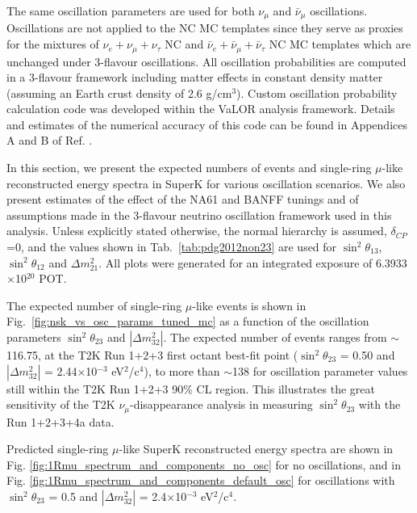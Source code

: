 The same oscillation parameters
are used for both $\nu_{\mu}$ and $\bar{\nu}_{\mu}$ oscillations.
Oscillations are not applied to the NC MC templates
since they serve as proxies for the mixtures of
$\nu_{e}+\nu_{\mu}+\nu_{\tau}$ NC and
$\bar{\nu}_{e}+\bar{\nu}_{\mu}+\bar{\nu}_{\tau}$ NC MC templates
which are unchanged under 3-flavour oscillations.
All oscillation probabilities are computed in a 3-flavour framework including matter effects in constant density matter
(assuming an Earth crust density of 2.6 g/cm$^{3}$).
Custom oscillation probability calculation code was developed within the VaLOR analysis framework.
Details and estimates of the numerical accuracy of this code can be found in 
Appendices A and B of Ref. \cite{OurRun123DisappAnalysis3Flavour}.


In this section, we present the expected numbers of events and single-ring $\mu$-like
reconstructed energy spectra in SuperK for various oscillation scenarios.
We also present estimates of the effect of the NA61 and BANFF tunings and of assumptions made in the 3-flavour
neutrino oscillation framework used in this analysis.
Unless explicitly stated otherwise, the normal hierarchy is assumed, $\delta_{CP}$=0,
and the values shown in Tab.\ \ref{tab:pdg2012non23}
are used for $\sin^{2}\theta_{13}$, $\sin^{2}\theta_{12}$ and $\Delta m^{2}_{21}$.
All plots were generated for an integrated exposure of 6.3933$\times$10$^{20}$ POT.

The expected number of single-ring $\mu$-like events is shown in Fig.\ \ref{fig:nsk_vs_osc_params_tuned_mc}
as a function of the oscillation parameters $\sin^{2}{\theta_{23}}$ and $|\Delta m^{2}_{32}|$.
The expected number of events ranges from $\sim$116.75,
at the T2K Run 1+2+3 first octant best-fit point ($\sin^{2}{\theta_{23}}$ = 0.50 and $|\Delta m^{2}_{32}|$ = 2.44$\times$10$^{-3}$ eV$^{2}$/c$^{4}$),
to more than $\sim$138 for oscillation parameter values still within the T2K Run 1+2+3 90\% CL region.
This illustrates the great sensitivity of the T2K $\nu_{\mu}$-disappearance analysis in measuring $\sin^{2}{\theta_{23}}$ 
with the Run 1+2+3+4a data.

Predicted single-ring $\mu$-like SuperK reconstructed energy spectra are shown in
Fig. \ref{fig:1Rmu_spectrum_and_components_no_osc} for no oscillations, and in
Fig. \ref{fig:1Rmu_spectrum_and_components_default_osc} for oscillations
with $\sin^{2}\theta_{23}$ = 0.5 and $|\Delta m^{2}_{32}|$ = 2.4$\times$10$^{-3}$ eV$^{2}$/c$^{4}$.

